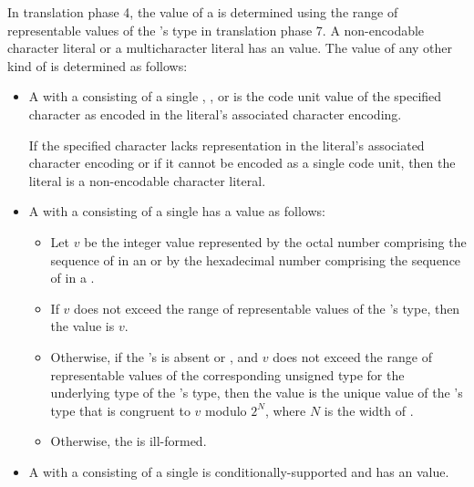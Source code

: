 \pnum
In translation phase 4,
the value of a  is determined
using the range of representable values
of the 's type in translation phase 7.
A non-encodable character literal or a multicharacter literal
has an
value.
The value of any other kind of 
is determined as follows:
\begin{itemize}
\item
A  with
a  consisting of a single
,
, or
is the code unit value of the specified character
as encoded in the literal's associated character encoding.
\begin{note}
If the specified character lacks
representation in the literal's associated character encoding or
if it cannot be encoded as a single code unit,
then the literal is a non-encodable character literal.
\end{note}
\item
A  with
a  consisting of
a single 
has a value as follows:
\begin{itemize}
\item
Let $v$ be the integer value represented by
the octal number comprising
the sequence of  in
an  or by
the hexadecimal number comprising
the sequence of  in
a .
\item
If $v$ does not exceed
the range of representable values of the 's type,
then the value is $v$.
\item
Otherwise,
if the 's 
is absent or , and
$v$ does not exceed the range of representable values of the corresponding unsigned type for the underlying type of the 's type,
then the value is the unique value of the 's type  that is congruent to $v$ modulo $2^N$, where $N$ is the width of .
\item
Otherwise, the  is ill-formed.
\end{itemize}
\item
A  with
a  consisting of
a single 
is conditionally-supported and
has an  value.
\end{itemize}

